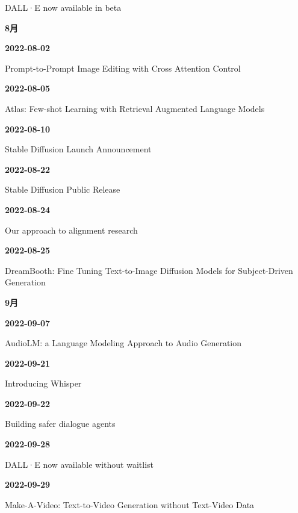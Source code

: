 {\raggedright DALL·E now available in beta\,\cite{src-16a1a1dc486e}\par}
\smallskip
\medskip
\noindent\textbf{8月}\par
\smallskip
\noindent\textbf{2022-08-02}\par
{\raggedright Prompt-to-Prompt Image Editing with Cross Attention Control\,\cite{chron-8e011f2374d2}\par}
\smallskip
\noindent\textbf{2022-08-05}\par
{\raggedright Atlas: Few-shot Learning with Retrieval Augmented Language Models\,\cite{src-039e57a4916e}\par}
\smallskip
\noindent\textbf{2022-08-10}\par
{\raggedright Stable Diffusion Launch Announcement\,\cite{src-2832ee43ab8f}\par}
\smallskip
\noindent\textbf{2022-08-22}\par
{\raggedright Stable Diffusion Public Release\,\cite{src-26aadbc0393f}\par}
\smallskip
\noindent\textbf{2022-08-24}\par
{\raggedright Our approach to alignment research\,\cite{src-d7f602cae828}\par}
\smallskip
\noindent\textbf{2022-08-25}\par
{\raggedright DreamBooth: Fine Tuning Text-to-Image Diffusion Models for Subject-Driven Generation\,\cite{src-76875f66d5f3}\par}
\smallskip
\medskip
\noindent\textbf{9月}\par
\smallskip
\noindent\textbf{2022-09-07}\par
{\raggedright AudioLM: a Language Modeling Approach to Audio Generation\,\cite{src-1b692f6d18b5}\par}
\smallskip
\noindent\textbf{2022-09-21}\par
{\raggedright Introducing Whisper\,\cite{src-2b132b9f05ef}\par}
\smallskip
\noindent\textbf{2022-09-22}\par
{\raggedright Building safer dialogue agents\,\cite{src-81cf88ab9c36}\par}
\smallskip
\noindent\textbf{2022-09-28}\par
{\raggedright DALL·E now available without waitlist\,\cite{src-27297a80fac0}\par}
\smallskip
\noindent\textbf{2022-09-29}\par
{\raggedright Make-A-Video: Text-to-Video Generation without Text-Video Data\,\cite{src-c19139f0be76}\par}
